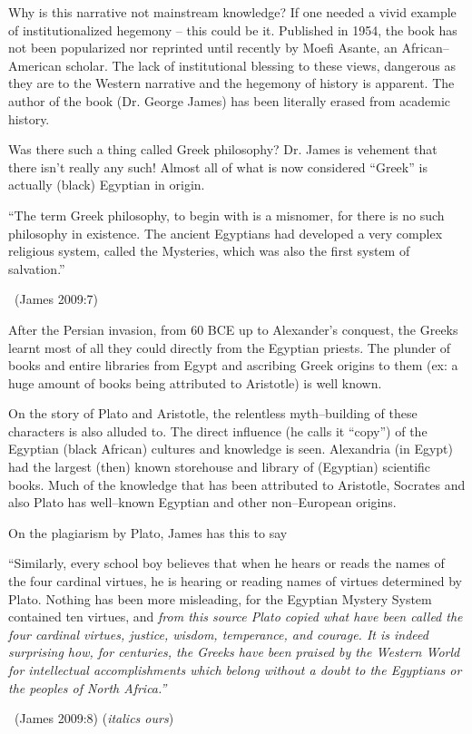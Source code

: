 Why is this narrative not mainstream knowledge? If one needed a vivid example of institutionalized hegemony – this could be it. Published in 1954, the book has not been popularized nor reprinted until recently by Moefi Asante, an African–American scholar. The lack of institutional blessing to these views, dangerous as they are to the Western narrative and the hegemony of history is apparent. The author of the book (Dr. George James) has been literally erased from academic history.

Was there such a thing called Greek philosophy? Dr. James is vehement that there isn’t really any such! Almost all of what is now considered “Greek” is actually (black) Egyptian in origin.

\begin{myquote}
“The term Greek philosophy, to begin with is a misnomer, for there is no such philosophy in existence. The ancient Egyptians had developed a very complex religious system, called the Mysteries, which was also the first system of salvation.”

~\hfill (James 2009:7)
\end{myquote}

After the Persian invasion, from 60 BCE up to Alexander’s conquest, the Greeks learnt most of all they could directly from the Egyptian priests. The plunder of books and entire libraries from Egypt and ascribing Greek origins to them (ex: a huge amount of books being attributed to Aristotle) is well known.

On the story of Plato and Aristotle, the relentless myth–building of these characters is also alluded to. The direct influence (he calls it “copy”) of the Egyptian (black African) cultures and knowledge is seen. Alexandria (in Egypt) had the largest (then) known storehouse and library of (Egyptian) scientific books. Much of the knowledge that has been attributed to Aristotle, Socrates and also Plato has well–known Egyptian and other non–European origins.

On the plagiarism by Plato, James has this to say

\begin{myquote}
“Similarly, every school boy believes that when he hears or reads the names of the four cardinal virtues, he is hearing or reading names of virtues determined by Plato. Nothing has been more misleading, for the Egyptian Mystery System contained ten virtues, and \textit{from this source Plato copied what have been called the four cardinal virtues, justice, wisdom, temperance, and courage. It is indeed surprising how, for centuries, the Greeks have been praised by the Western World for intellectual accomplishments which belong without a doubt to the Egyptians or the peoples of North Africa.”} 

~\hfill (James 2009:8) (\textit{italics ours})
\end{myquote}


